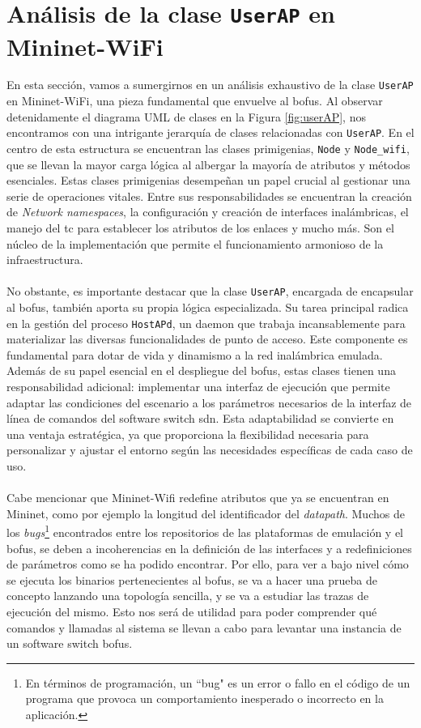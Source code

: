 \section{Análisis de la clase \texttt{UserAP} en Mininet-WiFi}
\label{sec:ana_userap}

En esta sección, vamos a sumergirnos en un análisis exhaustivo de la clase \texttt{UserAP} en Mininet-WiFi, una pieza fundamental que envuelve al \gls{bofus}. Al observar detenidamente el diagrama UML de clases en la Figura \ref{fig:userAP}, nos encontramos con una intrigante jerarquía de clases relacionadas con \texttt{UserAP}. En el centro de esta estructura se encuentran las clases primigenias, \texttt{Node} y \texttt{Node\_wifi}, que se llevan la mayor carga lógica al albergar la mayoría de atributos y métodos esenciales. Estas clases primigenias desempeñan un papel crucial al gestionar una serie de operaciones vitales. Entre sus responsabilidades se encuentran la creación de \textit{Network namespaces}, la configuración y creación de interfaces inalámbricas, el manejo del \gls{tc} para establecer los atributos de los enlaces y mucho más. Son el núcleo de la implementación que permite el funcionamiento armonioso de la infraestructura.\\
\\
No obstante, es importante destacar que la clase \texttt{UserAP}, encargada de encapsular al \gls{bofus}, también aporta su propia lógica especializada. Su tarea principal radica en la gestión del proceso \texttt{HostAPd}, un daemon que trabaja incansablemente para materializar las diversas funcionalidades de punto de acceso. Este componente es fundamental para dotar de vida y dinamismo a la red inalámbrica emulada. Además de su papel esencial en el despliegue del \gls{bofus}, estas clases tienen una responsabilidad adicional: implementar una interfaz de ejecución que permite adaptar las condiciones del escenario a los parámetros necesarios de la interfaz de línea de comandos del software switch \gls{sdn}. Esta adaptabilidad se convierte en una ventaja estratégica, ya que proporciona la flexibilidad necesaria para personalizar y ajustar el entorno según las necesidades específicas de cada caso de uso.\\
\\
Cabe mencionar que Mininet-Wifi redefine atributos que ya se encuentran en Mininet, como por ejemplo la longitud del identificador del \textit{datapath}. Muchos de los \textit{bugs}\footnote{En términos de programación, un ``bug" es un error o fallo en el código de un programa que provoca un comportamiento inesperado o incorrecto en la aplicación.} encontrados entre los repositorios de las plataformas de emulación y el \gls{bofus}, se deben a incoherencias en la definición de las interfaces y a redefiniciones de parámetros como se ha podido encontrar. Por ello, para ver a bajo nivel cómo se ejecuta los binarios pertenecientes al \gls{bofus}, se va a hacer una prueba de concepto lanzando una topología sencilla, y se va a estudiar las trazas de ejecución del mismo. Esto nos será de utilidad para poder comprender qué comandos y llamadas al sistema se llevan a cabo para levantar una instancia de un software switch \gls{bofus}.\\
\newpage

